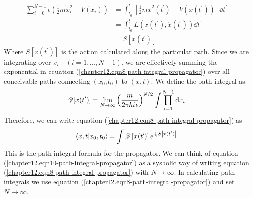 \begin{enumerate}
	\begin{align}
		\sum_{i=0}^{N-1} \epsilon \left(\frac{1}{2} m \dot{x}_i^2 - V(x_i)\right) 
		&= \int_{t_0}^{t} \left[\frac{1}{2} m \dot{x}^2(t^\prime) - V(x(t^\prime))\right] \dd{t^\prime} \\
		&= \int_{t_0}^{t} L\left(x(t^\prime), \dot{x}(t^\prime)\right) \dd{t^\prime} \\
		&= S[x(t^\prime)]
	\end{align}
	Where $S\left[x(t^\prime)\right]$ is the action calculated along the particular path. Since we are integrating over $x_i\quad (i=1,\ldots,N-1)$, we are effectively summing the exponential in equation (\ref{chapter12.eqn8-path-integral-propagator}) over all conceivable paths connecting $(x_0, t_0)$ to $(x, t)$. We define the path integral as
	\begin{equation}
		\mathcal{D}[x(t^\prime)] = \lim\limits_{N\rightarrow \infty} \left(\frac{m}{2 \pi \hbar {i\mkern1mu} \epsilon}\right)^{N/2} \int \prod_{i=1}^{N-1} \dd{x_i}
		\label{chapter12.eqn9-path-integral-propagator}
	\end{equation}
	Therefore, we can write equation (\ref{chapter12.eqn8-path-integral-propagator}) as
	\begin{equation}
		\braket{x, t}{x_0, t_0} = \int \mathcal{D}\left[x(t^\prime)\right] e^{\frac{i}{\hbar} S\left[x(t^\prime)\right]}
		\label{chapter12.eqn10-path-integral-propagator}
	\end{equation}
	This is the path integral formula for the propagator. We can think of equation (\ref{chapter12.eqn10-path-integral-propagator}) as a sysbolic way of writing equation (\ref{chapter12.eqn8-path-integral-propagator}) with $N \rightarrow \infty$. In calculating path integrals we use equation (\ref{chapter12.eqn8-path-integral-propagator}) and set $N \rightarrow \infty$.
	

\end{enumerate}
